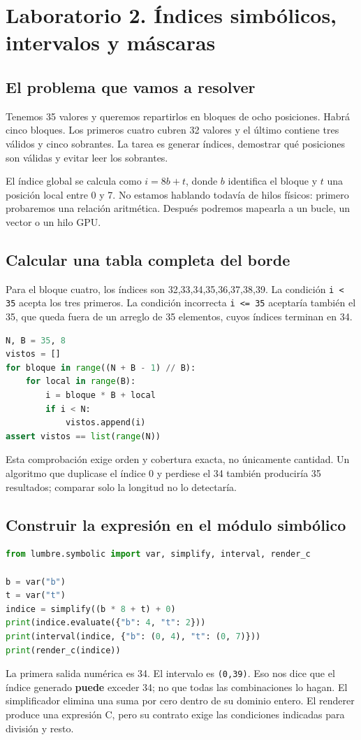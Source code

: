 \documentclass[12pt,a4paper,oneside]{report}
\begin{document}
\chapter{Laboratorio 2. Índices simbólicos, intervalos y máscaras}
\label{lab:dos}
\section{El problema que vamos a resolver}
Tenemos 35 valores y queremos repartirlos en bloques de ocho posiciones. Habrá cinco bloques. Los primeros cuatro cubren 32 valores y el último contiene tres válidos y cinco sobrantes. La tarea es generar índices, demostrar qué posiciones son válidas y evitar leer los sobrantes.

El índice global se calcula como $i=8b+t$, donde $b$ identifica el bloque y $t$ una posición local entre 0 y 7. No estamos hablando todavía de hilos físicos: primero probaremos una relación aritmética. Después podremos mapearla a un bucle, un vector o un hilo GPU.

\section{Calcular una tabla completa del borde}
Para el bloque cuatro, los índices son 32,33,34,35,36,37,38,39. La condición \texttt{i < 35} acepta los tres primeros. La condición incorrecta \texttt{i <= 35} aceptaría también el 35, que queda fuera de un arreglo de 35 elementos, cuyos índices terminan en 34.

\begin{lstlisting}[language=Python]
N, B = 35, 8
vistos = []
for bloque in range((N + B - 1) // B):
    for local in range(B):
        i = bloque * B + local
        if i < N:
            vistos.append(i)
assert vistos == list(range(N))
\end{lstlisting}
Esta comprobación exige orden y cobertura exacta, no únicamente cantidad. Un algoritmo que duplicase el índice 0 y perdiese el 34 también produciría 35 resultados; comparar solo la longitud no lo detectaría.

\section{Construir la expresión en el módulo simbólico}
\begin{lstlisting}[language=Python]
from lumbre.symbolic import var, simplify, interval, render_c

b = var("b")
t = var("t")
indice = simplify((b * 8 + t) + 0)
print(indice.evaluate({"b": 4, "t": 2}))
print(interval(indice, {"b": (0, 4), "t": (0, 7)}))
print(render_c(indice))
\end{lstlisting}
La primera salida numérica es 34. El intervalo es \texttt{(0,39)}. Eso nos dice que el índice generado \textbf{puede} exceder 34; no que todas las combinaciones lo hagan. El simplificador elimina una suma por cero dentro de su dominio entero. El renderer produce una expresión C, pero su contrato exige las condiciones indicadas para división y resto.
\end{document}
